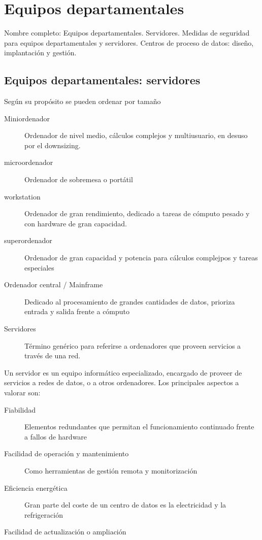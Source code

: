 \setcounter{section}{52}
\section{Equipos departamentales}

Nombre completo: Equipos departamentales. Servidores. Medidas de seguridad para equipos departamentales y servidores. Centros de proceso de datos: diseño, implantación y gestión.

\localtableofcontents

\subsection{Equipos departamentales: servidores}

Según su propósito se pueden ordenar por tamaño

\begin{description}
    \item[Miniordenador] Ordenador de nivel medio, cálculos complejos y multiusuario, en desuso por el downsizing.
    \item[microordenador] Ordenador de sobremesa o portátil
    \item[workstation] Ordenador de gran rendimiento, dedicado a tareas de cómputo pesado y con hardware de gran capacidad.
    \item[superordenador] Ordenador de gran capacidad y potencia para cálculos complejpos y tareas especiales
    \item[Ordenador central / Mainframe] Dedicado al procesamiento de grandes cantidades de datos, prioriza entrada y salida frente a cómputo
    \item[Servidores] Término genérico para referirse a ordenadores que proveen servicios a través de una red.
\end{description}

Un servidor es un equipo informático especializado, encargado de proveer de servicios a redes de datos, o a otros ordenadores. Los principales aspectos a valorar son:

\begin{description}
    \item[Fiabilidad] Elementos redundantes que permitan el funcionamiento continuado frente a fallos de hardware
    \item[Facilidad de operación y mantenimiento] Como herramientas de gestión remota y monitorización
    \item[Eficiencia energética] Gran parte del coste de un centro de datos es la electricidad y la refrigeración
    \item[Facilidad de actualización o ampliación]
\end{description}

